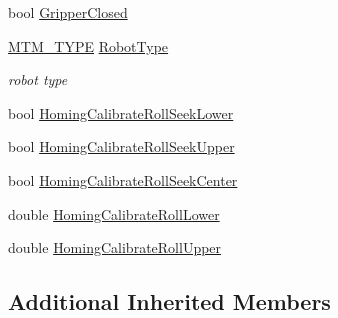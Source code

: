 \begin{DoxyCompactItemize}
bool \hyperlink{classmts_intuitive_research_kit_m_t_m_a01d3a4aee8e09094de4b74e0b0b7be5a}{Gripper\-Closed}
\item 
\hyperlink{classmts_intuitive_research_kit_m_t_m_a2122075f3ef6c751e5bf65b690bf5b69}{M\-T\-M\-\_\-\-T\-Y\-P\-E} \hyperlink{classmts_intuitive_research_kit_m_t_m_a622deaf143e19a4e0ae3009cc56a1ee1}{Robot\-Type}
\begin{DoxyCompactList}\small\item\em robot type \end{DoxyCompactList}\item 
bool \hyperlink{classmts_intuitive_research_kit_m_t_m_a903a6511516f4c55339303d54c9e34cc}{Homing\-Calibrate\-Roll\-Seek\-Lower}
\item 
bool \hyperlink{classmts_intuitive_research_kit_m_t_m_acbc506129e490dc537aa79e2a2ef97d8}{Homing\-Calibrate\-Roll\-Seek\-Upper}
\item 
bool \hyperlink{classmts_intuitive_research_kit_m_t_m_a436e19a4e45e73d1c02855c5dedc3b68}{Homing\-Calibrate\-Roll\-Seek\-Center}
\item 
double \hyperlink{classmts_intuitive_research_kit_m_t_m_a8be0d493c6060fc1c457d22bb6be9cbf}{Homing\-Calibrate\-Roll\-Lower}
\item 
double \hyperlink{classmts_intuitive_research_kit_m_t_m_aeef2dd3b27fabd87ce88152e605f385f}{Homing\-Calibrate\-Roll\-Upper}
\end{DoxyCompactItemize}
\subsection*{Additional Inherited Members}


